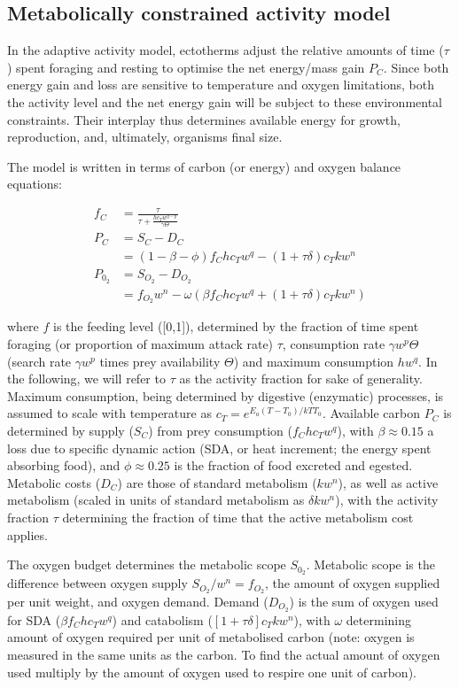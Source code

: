 \documentclass{article}\usepackage[]{graphicx}\usepackage[]{color}
\begin{document}
\subsection{Metabolically constrained activity model}

In the adaptive activity model, ectotherms adjust the relative amounts of time ($\tau$) spent foraging and resting to optimise the net energy/mass gain $P_C$. Since both energy gain and loss are sensitive to temperature and oxygen limitations, both the activity level and the net energy gain will be subject to these environmental constraints. Their interplay thus determines available energy for growth, reproduction, and, ultimately, organisms final size.

The model is written in terms of carbon (or energy) and oxygen balance equations:

\begin{align}
f_C &= \frac{\tau }{\tau  + \frac{h c_T w^{q-p}}{\gamma\Theta} } \label{eq:f} \\
P_C &= S_C - D_C \\
  &=(1-\beta-\phi)f_C h c_T w^q  -(1+\tau \delta)c_T k w^n \\ 
P_{0_2} &= S_{O_2} - D_{O_2} \\
        &= f_{O_2}w^n - \omega \left( \beta f_C h c_T w^q +(1+\tau \delta) c_T k w^n \right)
\end{align}


where $f$ is the feeding level ([0,1]), determined by the fraction of time spent foraging (or proportion of maximum attack rate) $\tau$, consumption rate $\gamma w^p \Theta$ (search rate $\gamma w^p$ times prey availability $\Theta$) and maximum consumption $h w^q$. In the following, we will refer to $\tau$ as the activity fraction for sake of generality. Maximum consumption, being determined by digestive (enzymatic) processes, is assumed to scale with temperature as $c_T = e^{E_a(T-T_0)/kTT_0}$. Available carbon $P_C$ is determined by supply ($S_C$) from prey consumption ($f_C h c_T w^q$), with $\beta \approx 0.15$ a loss due to specific dynamic action (SDA, or heat increment; the energy spent absorbing food), and $\phi \approx 0.25$ is the fraction of food excreted and egested. Metabolic costs ($D_C$) are those of standard metabolism ($k w^n$), as well as active metabolism (scaled in units of standard metabolism as $\delta k w^n$), with the activity fraction $\tau$ determining the fraction of time that the active metabolism cost applies.  

The oxygen budget determines the metabolic scope $S_{0_2}$. Metabolic scope is the difference between oxygen supply $S_{O_2}/w^n=f_{O_2}$, the amount of oxygen supplied per unit weight, and oxygen demand. Demand ($D_{O_2}$) is the sum of oxygen used for SDA ($\beta f_C h c_T w^q$) and catabolism ($[1+\tau \delta] c_T k w^n$), with $\omega$ determining amount of oxygen required per unit of metabolised carbon (note: oxygen is measured in the same units as the carbon. To find the actual amount of oxygen used multiply by the amount of oxygen used to respire one unit of carbon). 
\end{document}
